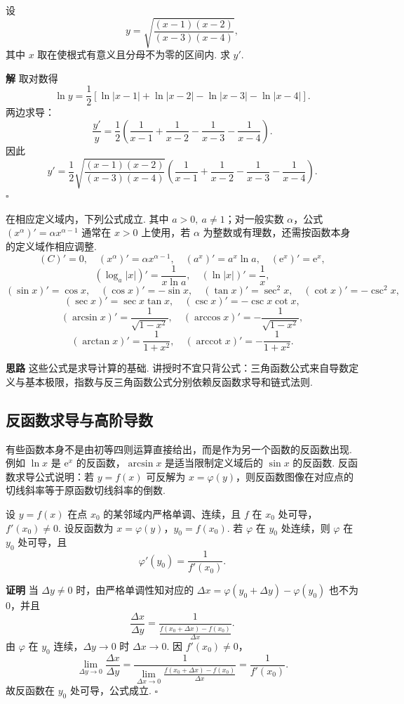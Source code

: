 \documentclass[fontset=fandol]{ctexart}
\newenvironment{proofdetail}{\par\noindent\textbf{证明}\quad}{\hfill$\square$\par\vspace{0.8em}}
\newenvironment{solution}{\par\noindent\textbf{解}\quad}{\hfill$\square$\par\vspace{0.8em}}
\newenvironment{idea}{\par\noindent\textbf{思路}\quad}{\par\vspace{0.4em}}
\newcommand{\ee}{\mathrm{e}}
\begin{document}
\begin{example}[对数求导]
设
\[
y=\sqrt{\frac{(x-1)(x-2)}{(x-3)(x-4)}},
\]
其中 $x$ 取在使根式有意义且分母不为零的区间内. 求 $y'$.
\end{example}
\begin{solution}
取对数得
\[
\ln y=\frac12\left[\ln|x-1|+\ln|x-2|-\ln|x-3|-\ln|x-4|\right].
\]
两边求导：
\[
\frac{y'}{y}
=\frac12\left(\frac1{x-1}+\frac1{x-2}-\frac1{x-3}-\frac1{x-4}\right).
\]
因此
\[
y'=\frac12\sqrt{\frac{(x-1)(x-2)}{(x-3)(x-4)}}
\left(\frac1{x-1}+\frac1{x-2}-\frac1{x-3}-\frac1{x-4}\right).
\]
\end{solution}

\begin{proposition}[常用基本导数公式]
在相应定义域内，下列公式成立. 其中 $a>0,\ a\neq1$；对一般实数 $\alpha$，公式 $(x^\alpha)'=\alpha x^{\alpha-1}$ 通常在 $x>0$ 上使用，若 $\alpha$ 为整数或有理数，还需按函数本身的定义域作相应调整.
\[
(C)'=0,\quad (x^\alpha)'=\alpha x^{\alpha-1},\quad (a^x)'=a^x\ln a,\quad (\ee^x)'=\ee^x,
\]
\[
(\log_a |x|)'=\frac1{x\ln a},\quad (\ln |x|)'=\frac1x,
\]
\[
(\sin x)'=\cos x,\quad (\cos x)'=-\sin x,\quad
(\tan x)'=\sec^2x,\quad (\cot x)'=-\csc^2x,
\]
\[
(\sec x)'=\sec x\tan x,\quad (\csc x)'=-\csc x\cot x,
\]
\[
(\arcsin x)'=\frac1{\sqrt{1-x^2}},\quad
(\arccos x)'=-\frac1{\sqrt{1-x^2}},
\]
\[
(\arctan x)'=\frac1{1+x^2},\quad
(\operatorname{arccot}x)'=-\frac1{1+x^2}.
\]
\end{proposition}
\begin{idea}
这些公式是求导计算的基础. 讲授时不宜只背公式：三角函数公式来自导数定义与基本极限，指数与反三角函数公式分别依赖反函数求导和链式法则.
\end{idea}

\subsection{反函数求导与高阶导数}

有些函数本身不是由初等四则运算直接给出，而是作为另一个函数的反函数出现. 例如 $\ln x$ 是 $\ee^x$ 的反函数，$\arcsin x$ 是适当限制定义域后的 $\sin x$ 的反函数. 反函数求导公式说明：若 $y=f(x)$ 可反解为 $x=\varphi(y)$，则反函数图像在对应点的切线斜率等于原函数切线斜率的倒数.

\begin{theorem}[反函数求导公式]
设 $y=f(x)$ 在点 $x_0$ 的某邻域内严格单调、连续，且 $f$ 在 $x_0$ 处可导，$f'(x_0)\neq0$. 设反函数为 $x=\varphi(y)$，$y_0=f(x_0)$. 若 $\varphi$ 在 $y_0$ 处连续，则 $\varphi$ 在 $y_0$ 处可导，且
\[
\varphi'(y_0)=\frac{1}{f'(x_0)}.
\]
\end{theorem}
\begin{proofdetail}
当 $\Delta y\neq0$ 时，由严格单调性知对应的 $\Delta x=\varphi(y_0+\Delta y)-\varphi(y_0)$ 也不为 $0$，并且
\[
\frac{\Delta x}{\Delta y}
=\frac{1}{\frac{f(x_0+\Delta x)-f(x_0)}{\Delta x}}.
\]
由 $\varphi$ 在 $y_0$ 连续，$\Delta y\to0$ 时 $\Delta x\to0$. 因 $f'(x_0)\neq0$，
\[
\lim_{\Delta y\to0}\frac{\Delta x}{\Delta y}
=\frac{1}{\lim_{\Delta x\to0}\frac{f(x_0+\Delta x)-f(x_0)}{\Delta x}}
=\frac1{f'(x_0)}.
\]
故反函数在 $y_0$ 处可导，公式成立.
\end{proofdetail}
\end{document}
